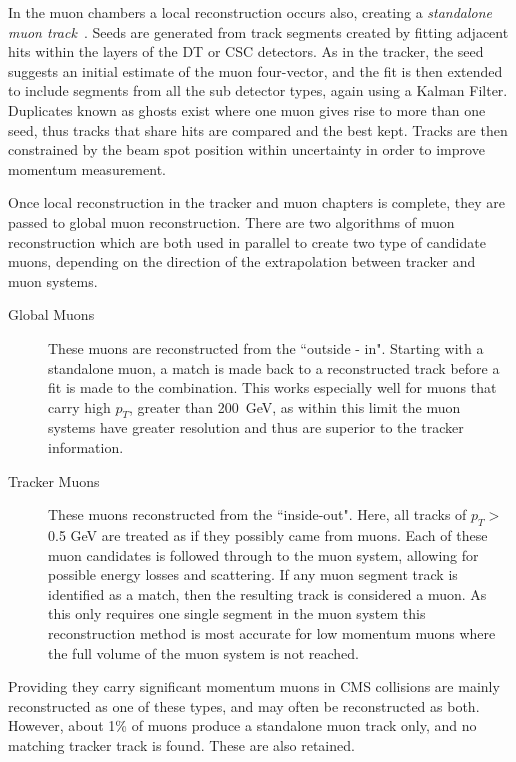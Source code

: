 In the muon chambers a local reconstruction occurs also, creating a \textit{standalone muon track}~\cite{muonperf}. Seeds are generated from track segments created by fitting adjacent hits within the layers of the DT or CSC detectors. As in the tracker, the seed suggests an initial estimate of the muon four-vector, and the fit is then extended to include segments from all the sub detector types, again using a Kalman Filter. Duplicates known as ghosts exist where one muon gives rise to more than one seed, thus tracks that share hits are compared and the best kept. Tracks are then constrained by the beam spot position within uncertainty in order to improve momentum measurement. 

Once local reconstruction in the tracker and muon chapters is complete, they are passed to global muon reconstruction. There are two algorithms of muon reconstruction which are both used in parallel to create two type of candidate muons, depending on the direction of the extrapolation between tracker and muon systems. 

\begin{description}
\item[Global Muons]{These muons are reconstructed from the ``outside - in". Starting with a standalone muon, a match is made back to a reconstructed track before a fit is made to the combination. This works especially well for muons that carry high $p_{T}$, greater than 200~GeV, as within this limit the muon systems have greater resolution and thus are superior to the tracker information.}
\item[Tracker Muons]{These muons reconstructed from the ``inside-out". Here, all tracks of $p_{T} >$ 0.5 GeV are treated as if they possibly came from muons. Each of these muon candidates is followed through to the muon system, allowing for possible energy losses and scattering.  If any muon segment track is identified as a match, then the resulting track is considered a muon. As this only requires one single segment in the muon system this reconstruction method is most accurate for low momentum muons where the full volume of the muon system is not reached.}

\end{description}

Providing they carry significant momentum muons in CMS collisions are mainly reconstructed as one of these types, and may often be reconstructed as both. However, about 1\% of muons produce a standalone muon track only, and no matching tracker track is found. These are also retained. 

